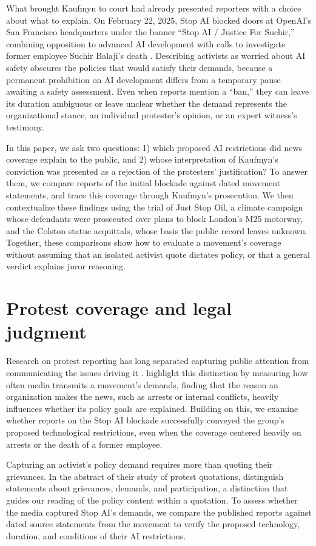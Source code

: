 \documentclass[11pt]{article}
\begin{document}
What brought Kaufmyn to court had already presented reporters with a choice about what to explain. On February 22, 2025, Stop AI blocked doors at OpenAI's San Francisco headquarters under the banner ``Stop AI / Justice For Suchir,'' combining opposition to advanced AI development with calls to investigate former employee Suchir Balaji's death \citep{stoprelease}. Describing activists as worried about AI safety obscures the policies that would satisfy their demands, because a permanent prohibition on AI development differs from a temporary pause awaiting a safety assessment. Even when reports mention a ``ban,'' they can leave its duration ambiguous or leave unclear whether the demand represents the organizational stance, an individual protester's opinion, or an expert witness's testimony.

In this paper, we ask two questions: 1) which proposed AI restrictions did news coverage explain to the public, and 2) whose interpretation of Kaufmyn's conviction was presented as a rejection of the protesters' justification? To answer them, we compare reports of the initial blockade against dated movement statements, and trace this coverage through Kaufmyn's prosecution. We then contextualize these findings using the trial of Just Stop Oil, a climate campaign whose defendants were prosecuted over plans to block London's M25 motorway, and the Colston statue acquittals, whose basis the public record leaves unknown. Together, these comparisons show how to evaluate a movement's coverage without assuming that an isolated activist quote dictates policy, or that a general verdict explains juror reasoning.

\section{Protest coverage and legal judgment}
Research on protest reporting has long separated capturing public attention from communicating the issues driving it \citep{smith}. \citet{amenta} highlight this distinction by measuring how often media transmits a movement's demands, finding that the reason an organization makes the news, such as arrests or internal conflicts, heavily influences whether its policy goals are explained. Building on this, we examine whether reports on the Stop AI blockade successfully conveyed the group's proposed technological restrictions, even when the coverage centered heavily on arrests or the death of a former employee.

Capturing an activist's policy demand requires more than quoting their grievances. In the abstract of their study of protest quotations, \citet{caren} distinguish statements about grievances, demands, and participation, a distinction that guides our reading of the policy content within a quotation. To assess whether the media captured Stop AI's demands, we compare the published reports against dated source statements from the movement to verify the proposed technology, duration, and conditions of their AI restrictions.
\end{document}
